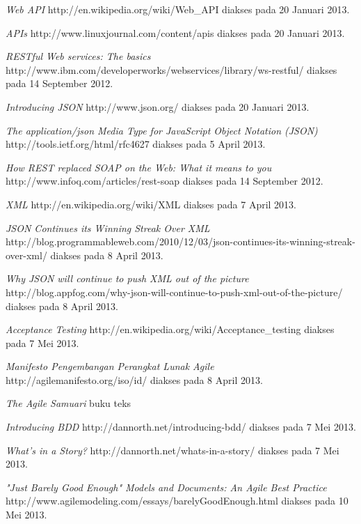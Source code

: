 \documentclass[a4paper, 12pt, oneside]{report}
\begin{document}
\begin{thebibliography}{99}
  \emph{Web API}
  http://en.wikipedia.org/wiki/Web\_API
  diakses pada 20 Januari 2013.
  
  \emph{APIs}
  http://www.linuxjournal.com/content/apis
  diakses pada 20 Januari 2013.

  \emph{RESTful Web services: The basics}
  \\http://www.ibm.com/developerworks/webservices/library/ws-restful/
  diakses pada 14 September 2012.

  \emph{Introducing JSON} http://www.json.org/
  diakses pada 20 Januari 2013.
  
  \emph{The application/json Media Type for JavaScript Object Notation (JSON)} http://tools.ietf.org/html/rfc4627
  diakses pada 5 April 2013.
    
  \emph{How REST replaced SOAP on the Web: What it means to you}
  http://www.infoq.com/articles/rest-soap
  diakses pada 14 September 2012.
  
  \emph{XML}
  http://en.wikipedia.org/wiki/XML
  diakses pada 7 April 2013.
  
  \emph{JSON Continues its Winning Streak Over XML}
  http://blog.programmableweb.com/2010/12/03/json-continues-its-winning-streak-over-xml/
  diakses pada 8 April 2013.
  
  \emph{Why JSON will continue to push XML out of the picture}
  http://blog.appfog.com/why-json-will-continue-to-push-xml-out-of-the-picture/
  diakses pada 8 April 2013.
  
  \emph{Acceptance Testing}
  http://en.wikipedia.org/wiki/Acceptance\_testing
  diakses pada 7 Mei 2013.

  \emph{Manifesto Pengembangan Perangkat Lunak Agile}
  http://agilemanifesto.org/iso/id/
  diakses pada 8 April 2013.
  
  \emph{The Agile Samuari}
  buku teks
  
  \emph{Introducing BDD}
  http://dannorth.net/introducing-bdd/
  diakses pada 7 Mei 2013.
  
  \emph{What's in a Story?}
  http://dannorth.net/whats-in-a-story/
  diakses pada 7 Mei 2013.

  \emph{"Just Barely Good Enough" Models and Documents: An Agile Best Practice}
  http://www.agilemodeling.com/essays/barelyGoodEnough.html
  diakses pada 10 Mei 2013.
 
\end{thebibliography}
\end{document}
